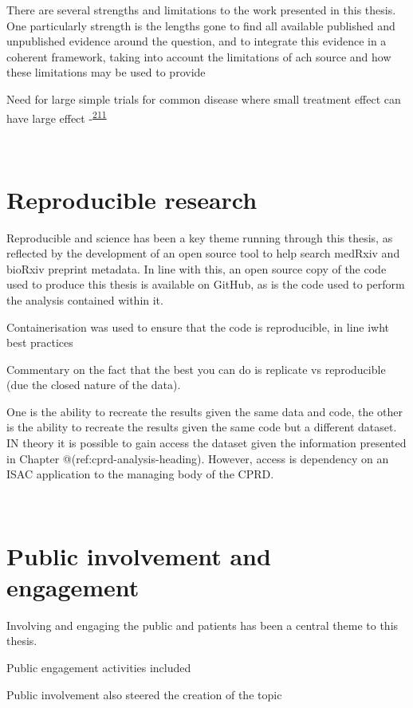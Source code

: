 \documentclass[a4paper, twoside]{templates/ociamthesis}
\begin{document}
There are several strengths and limitations to the work presented in this thesis. One particularly strength is the lengths gone to find all available published and unpublished evidence around the question, and to integrate this evidence in a coherent framework, taking into account the limitations of ach source and how these limitations may be used to provide

Need for large simple trials for common disease where small treatment effect can have large effect -\textsuperscript{\protect\hyperlink{ref-yusuf1984}{211}}

~

\hypertarget{reproducible-research}{%
\section{Reproducible research}\label{reproducible-research}}

Reproducible and science has been a key theme running through this thesis, as reflected by the development of an open source tool to help search medRxiv and bioRxiv preprint metadata. In line with this, an open source copy of the code used to produce this thesis is available on GitHub, as is the code used to perform the analysis contained within it.

Containerisation was used to ensure that the code is reproducible, in line iwht best practices

Commentary on the fact that the best you can do is replicate vs reproducible (due the closed nature of the data).

One is the ability to recreate the results given the same data and code, the other is the ability to recreate the results given the same code but a different dataset. IN theory it is possible to gain access the dataset given the information presented in Chapter @(ref:cprd-analysis-heading). However, access is dependency on an ISAC application to the managing body of the CPRD.

~

\hypertarget{disc-PPI}{%
\section{Public involvement and engagement}\label{disc-PPI}}

Involving and engaging the public and patients has been a central theme to this thesis.

Public engagement activities included

Public involvement also steered the creation of the topic
\end{document}
